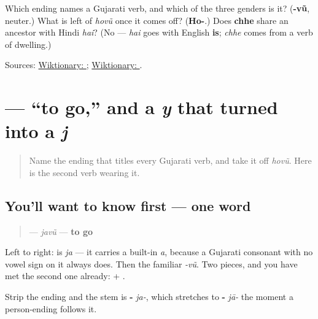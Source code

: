 \begin{tcolorbox}[breakable,colback=teal!4,colframe=teal!35!black,title={Before you move on}]
Which ending names a Gujarati verb, and which of the three genders is it? (\textbf{-vũ}, neuter.) What is left of \emph{hovũ} once it comes off? (\textbf{Ho-}.) Does \textbf{chhe} share an ancestor with Hindi \emph{hai}? (No — \emph{hai} goes with English \textbf{is}; \emph{chhe} comes from a verb of dwelling.)

Sources: \href{https://en.wiktionary.org/wiki/\%E0\%AA\%B9\%E0\%AB\%8B\%E0\%AA\%B5\%E0\%AB\%81\%E0\%AA\%82}{Wiktionary: }; \href{https://en.wiktionary.org/wiki/\%E0\%AA\%9B\%E0\%AB\%87}{Wiktionary: }.
\end{tcolorbox}
\section[\texorpdfstring{\gu{જવું} (javũ)}{જવું (javũ)}]{ — \textquotedblleft{}to go,\textquotedblright{} and a \emph{y} that turned into a \emph{j}}

\label{lesson:GU-C07-javun}



\begin{quote}
Name the ending that titles every Gujarati verb, and take it off \emph{hovũ}. Here is the second verb wearing it.
\end{quote}

\subsection*{You'll want to know first — one word}
\begin{quote}
\textbf{} — \emph{javũ} — \textbf{to go}
\end{quote}

Left to right: \textbf{} is \emph{ja} — it carries a built-in \emph{a}, because a Gujarati consonant with no vowel sign on it always does. Then the familiar \textbf{} \emph{-vũ}. Two pieces, and you have met the second one already: \textbf{} + \textbf{}.

Strip the ending and the stem is \textbf{-} \emph{ja-}, which stretches to \textbf{-} \emph{jā-} the moment a person-ending follows it.

